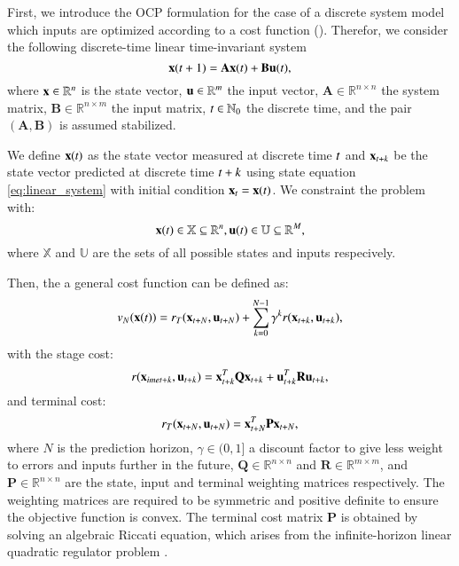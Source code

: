 First, we introduce the OCP formulation for the case of a discrete system model which inputs are optimized according to a cost function (). Therefor, we consider the following discrete-time linear time-invariant system
\begin{equation}
\label{eq:linear_system}
    \mathbf{\mathbf{x}}(t+1) = \mathbf{A\mathbf{x}}(t) + \mathbf{B\mathbf{u}}(t),
\end{equation}
\noindent where $\mathbf{x} \in \mathbb{R}^{n}$ is the state vector, $\mathbf{u} \in \mathbb{R}^{m}$ the input vector, $\mathbf{A} \in \mathbb{R}^{n \times n}$ the system matrix, $\mathbf{B} \in \mathbb{R}^{n \times m}$ the input matrix, $t \in \mathbb{N}_0$ the discrete time, and the pair $(\mathbf{A},\mathbf{B})$ is assumed stabilized.

We define $\mathbf{x}(t)$ as the state vector measured at discrete time $t$ and $\mathbf{x}_{t+k}$ be the state vector predicted at discrete time $t+k$ using state equation \ref{eq:linear_system} with initial condition $\mathbf{x}_t = \mathbf{x}(t)$.
We constraint the problem with:
\begin{equation}
\label{eq:constraints}
    \mathbf{x}(t) \in \mathbb{X} \subseteq \mathbb{R}^{n}, \mathbf{u}(t) \in \mathbb{U} \subseteq \mathbb{R}^{M},
\end{equation}
\noindent where $\mathbb{X}$ and $\mathbb{U}$ are the sets of all possible states and inputs respecively.

Then, the a general cost function can be defined as:
\begin{equation}
\label{eq:cost_function}
    v_N(\mathbf{x}(t)) = r_T(\mathbf{x}_{t+N}, \mathbf{u}_{t+N}) + \sum^{N-1}_{k=0} \gamma^k r(\mathbf{x}_{t+k}, \mathbf{u}_{t+k}),
\end{equation}
\noindent with the stage cost:
\begin{equation}
\label{eq:stage_cost}
    r(\mathbf{x}_{imet+k}, \mathbf{u}_{t+k}) = \mathbf{x}_{t+k}^T\mathbf{Q}\mathbf{x}_{t+k} + \mathbf{u}_{t+k}^T\mathbf{R}\mathbf{u}_{t+k},
\end{equation}
\noindent and terminal cost:
\begin{equation}
\label{eq:terminal_cost}
    r_T(\mathbf{x}_{t+N}, \mathbf{u}_{t+N}) = \mathbf{x}_{t+N}^T\mathbf{P}\mathbf{x}_{t+N} ,
\end{equation}
\noindent where $N$ is the prediction horizon, $\gamma \in (0,1]$ a discount factor to give less weight to errors and inputs further in the future, $\mathbf{Q} \in \mathbb{R}^{n \times n}$ and $\mathbf{R} \in \mathbb{R}^{m \times m}$, and $\mathbf{P} \in \mathbb{R}^{n \times n}$ are the state, input and terminal weighting matrices respectively. The weighting matrices are required to be symmetric and positive definite to ensure the objective function is convex. The terminal cost matrix $\mathbf{P}$ is obtained by solving an algebraic Riccati equation, which arises from the infinite-horizon linear quadratic regulator problem \citep{Camacho2013}.

